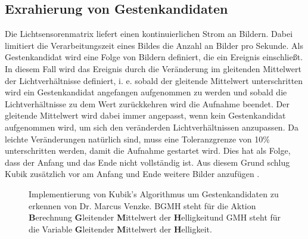 \subsection{Exrahierung von Gestenkandidaten}
\label{sec:gesture_extraction}
Die Lichtsensorenmatrix liefert einen kontinuierlichen Strom an Bildern. Dabei limitiert die Verarbeitungszeit eines Bildes die Anzahl an Bilder pro Sekunde. Als Gestenkandidat wird eine Folge von Bildern definiert, die
ein Ereignis einschließt. In diesem Fall wird das Ereignis durch die Veränderung im gleitenden Mittelwert der Lichtverhältnisse definiert, i. e. sobald der gleitende Mittelwert unterschritten wird ein Gestenkandidat
angefangen aufgenommen zu werden und sobald die Lichtverhältnisse zu dem Wert zurückkehren wird die Aufnahme beendet. Der gleitende Mittelwert wird dabei immer angepasst, wenn kein Gestenkandidat aufgenommen wird, um
sich den veränderden Lichtverhältnissen anzupassen. Da leichte Veränderungen natürlich sind, muss eine Toleranzgrenze von 10\% unterschritten werden, damit die Aufnahme gestartet wird. Dies hat als Folge, dass der Anfang
und das Ende nicht vollständig ist. Aus diesem Grund schlug Kubik zusätzlich vor am Anfang und Ende weitere Bilder anzufügen \cite{kubikThesis}.
\newline
\newline
\begin{figure}
    \usetikzlibrary{arrows,automata,positioning}
    \centering
    \caption{Implementierung von Kubik's Algorithmus um Gestenkandidaten zu erkennen von Dr. Marcus Venzke. BGMH steht für die Aktion \glqq \textbf{B}erechnung \textbf{G}leitender \textbf{M}ittelwert der \textbf{H}elligkeit\grqq und GMH steht für die Variable \glqq \textbf{G}leitender \textbf{M}ittelwert der \textbf{H}elligkeit\grqq.}
    \label{fig:venzkeAlgoImpl}
\end{figure}
